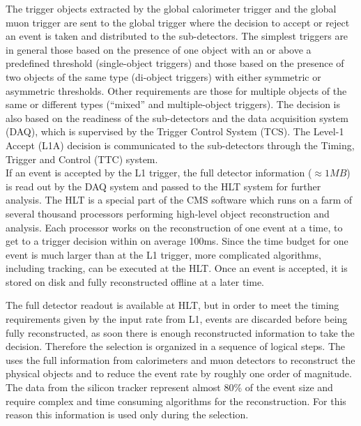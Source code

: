 The trigger objects extracted by the global calorimeter trigger and the global muon trigger are sent to the global trigger where the decision to accept or reject an event is taken and distributed to the sub-detectors. 
The simplest triggers are in general those based on the presence of one object with an \ET or \PT above a predefined threshold (single-object triggers) and those based on the presence of two objects of the same type (di-object triggers) with either symmetric or asymmetric thresholds. Other requirements are those for multiple objects of the same or different types (``mixed'' and multiple-object triggers).
The decision is also based on the readiness of the sub-detectors and the data acquisition system (DAQ), which is supervised by the Trigger Control System (TCS). The Level-1 Accept (L1A) decision is communicated to the sub-detectors through the Timing, Trigger and Control (TTC) system.\\ 

If an event is accepted by the L1 trigger, the full detector information ($\approx1\unit{MB}$) is read out by the DAQ system and passed to the HLT system for further analysis. The HLT is a special part of the CMS software which runs on a farm of several thousand processors performing high-level object reconstruction and analysis.
Each processor works on the reconstruction of one event at a time, to get to a trigger decision within on average 100\unit{ms}. Since the time budget for one event is much larger than at the L1 trigger, more complicated algorithms, including tracking, can be executed at the HLT. Once an event is accepted, it is stored on disk and fully reconstructed offline at a later time. 

The full detector readout is available at HLT, but in order to meet the timing requirements given by the input rate from L1, events are discarded before being fully reconstructed, as soon there is enough reconstructed information to take the decision. Therefore the selection is organized in a sequence of logical steps. The \Ltwo uses the full information from calorimeters and muon detectors to reconstruct the physical objects and to reduce the event rate by roughly one order of magnitude. The data from the silicon tracker represent almost 80\% of the event size and require complex and time consuming algorithms for the reconstruction. For this reason this information is used only during the \Lthree selection.

